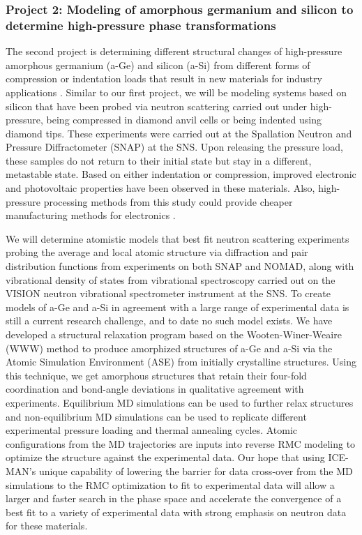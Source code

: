 \subsubsection*{Project 2: Modeling of amorphous germanium and silicon to determine high-pressure phase transformations}\label{haberl}

The second project is determining different structural changes of high-pressure amorphous germanium (a-Ge) and silicon (a-Si) from different forms of compression or indentation loads that result in new materials for industry applications \cite{Haberl2009, Borisenko2012, Haberl2014}. Similar to our first project, we will be modeling systems based on silicon that have been probed via neutron scattering carried out under high-pressure, being compressed in diamond anvil cells or being indented using diamond tips. These experiments were carried out at the Spallation Neutron and Pressure Diffractometer (SNAP) \cite{SNAPwebsite} at the SNS. Upon releasing the pressure load, these samples do not return to their initial state but stay in a different, metastable state. Based on either indentation or compression, improved electronic and photovoltaic properties have been observed in these materials. Also, high-pressure processing methods from this study could provide cheaper manufacturing methods for electronics \cite{Holmstrom2016}.

We will determine atomistic models that best fit neutron scattering experiments probing the average and local atomic structure via diffraction and pair distribution functions from experiments on both SNAP and NOMAD, along with vibrational density of states from vibrational spectroscopy carried out on the VISION neutron vibrational spectrometer instrument \cite{VISIONwebsite} at the SNS. To create models of a-Ge and a-Si in agreement with a large range of experimental data is still a current research challenge, and to date no such model exists. We have developed a structural relaxation program based on the Wooten-Winer-Weaire (WWW) method \cite{Wooten1985} to produce amorphized structures of a-Ge and a-Si via the Atomic Simulation Environment (ASE) \cite{ Bahn2002, ASEwebsite} from initially crystalline structures. Using this technique, we get amorphous structures that retain their four-fold coordination and bond-angle deviations in qualitative agreement with experiments\cite{Wooten1985}.  Equilibrium MD simulations can be used to further relax structures and non-equilibrium MD simulations can be used to replicate different experimental pressure loading and thermal annealing cycles. Atomic configurations from the MD trajectories are inputs into reverse RMC modeling to optimize the structure against the experimental data. Our hope that using ICE-MAN's unique capability of lowering the barrier for data cross-over from the MD simulations to the RMC optimization to fit to experimental data will allow a larger and faster search in the phase space and accelerate the convergence of a best fit to a variety of experimental data with strong emphasis on neutron data for these materials.